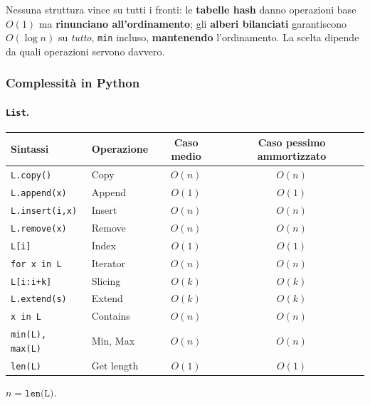 \documentclass[12pt, a4paper]{article}
\begin{document}
\begin{tcolorbox}[colback=lightergray!5, colframe=tocsubsec, title=\textbf{Il Compromesso Centrale}]
Nessuna struttura vince su tutti i fronti: le \textcolor{green!50!black}{\textbf{tabelle hash}} danno operazioni base $O(1)$ ma \textbf{rinunciano all'ordinamento}; gli \textcolor{orange!80!black}{\textbf{alberi bilanciati}} garantiscono $O(\log n)$ su \emph{tutto}, \texttt{min} incluso, \textbf{mantenendo} l'ordinamento. La scelta dipende da quali operazioni servono davvero.
\end{tcolorbox}

\subsubsection{Complessità in Python}

\paragraph{\texttt{List}.}
\begin{center}
\small
\begin{tabular}{llcc}
\toprule
\textbf{Sintassi} & \textbf{Operazione} & \textbf{Caso medio} & \textbf{Caso pessimo ammortizzato} \\
\midrule
\texttt{L.copy()} & Copy & $O(n)$ & $O(n)$ \\
\texttt{L.append(x)} & Append & $O(1)$ & $O(1)$ \\
\texttt{L.insert(i,x)} & Insert & $O(n)$ & $O(n)$ \\
\texttt{L.remove(x)} & Remove & $O(n)$ & $O(n)$ \\
\texttt{L[i]} & Index & $O(1)$ & $O(1)$ \\
\texttt{for x in L} & Iterator & $O(n)$ & $O(n)$ \\
\texttt{L[i:i+k]} & Slicing & $O(k)$ & $O(k)$ \\
\texttt{L.extend(s)} & Extend & $O(k)$ & $O(k)$ \\
\texttt{x in L} & Contains & $O(n)$ & $O(n)$ \\
\texttt{min(L), max(L)} & Min, Max & $O(n)$ & $O(n)$ \\
\texttt{len(L)} & Get length & $O(1)$ & $O(1)$ \\
\bottomrule
\end{tabular}
\end{center}
\textit{$n=\texttt{len(L)}$.}
\end{document}
